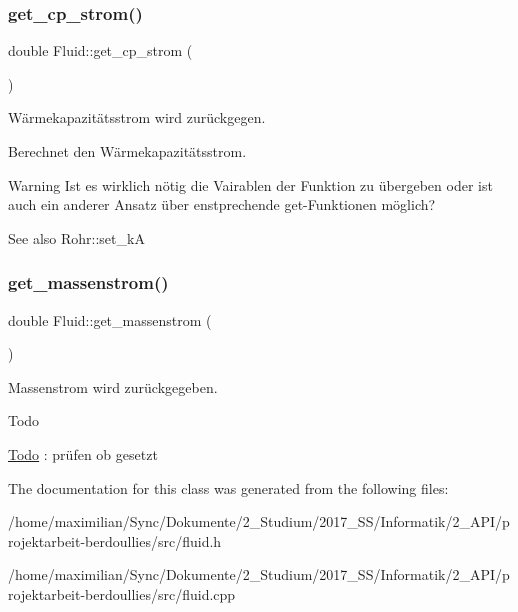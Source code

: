 \subsubsection{\texorpdfstring{get\+\_\+cp\+\_\+strom()}{get\_cp\_strom()}}
{\footnotesize\ttfamily double Fluid\+::get\+\_\+cp\+\_\+strom (\begin{DoxyParamCaption}{ }\end{DoxyParamCaption})}



Wärmekapazitätsstrom wird zurückgegen. 

Berechnet den Wärmekapazitätsstrom.

\begin{DoxyWarning}{Warning}
Ist es wirklich nötig die Vairablen der Funktion zu übergeben oder ist auch ein anderer Ansatz über enstprechende get-\/\+Funktionen möglich? 
\end{DoxyWarning}
\begin{DoxySeeAlso}{See also}
Rohr\+::set\+\_\+kA 
\end{DoxySeeAlso}
\mbox{\label{class_fluid_afd9451c48ea66d15fdb8226da58da28e}} 
\subsubsection{\texorpdfstring{get\+\_\+massenstrom()}{get\_massenstrom()}}
{\footnotesize\ttfamily double Fluid\+::get\+\_\+massenstrom (\begin{DoxyParamCaption}{ }\end{DoxyParamCaption})}



Massenstrom wird zurückgegeben. 

\begin{DoxyRefDesc}{Todo}
\item[\hyperlink{todo__todo000001}{Todo}]\+: prüfen ob gesetzt \end{DoxyRefDesc}


The documentation for this class was generated from the following files\+:\begin{DoxyCompactItemize}
\item 
/home/maximilian/\+Sync/\+Dokumente/2\+\_\+\+Studium/2017\+\_\+\+S\+S/\+Informatik/2\+\_\+\+A\+P\+I/projektarbeit-\/berdoullies/src/fluid.\+h\item 
/home/maximilian/\+Sync/\+Dokumente/2\+\_\+\+Studium/2017\+\_\+\+S\+S/\+Informatik/2\+\_\+\+A\+P\+I/projektarbeit-\/berdoullies/src/fluid.\+cpp\end{DoxyCompactItemize}
